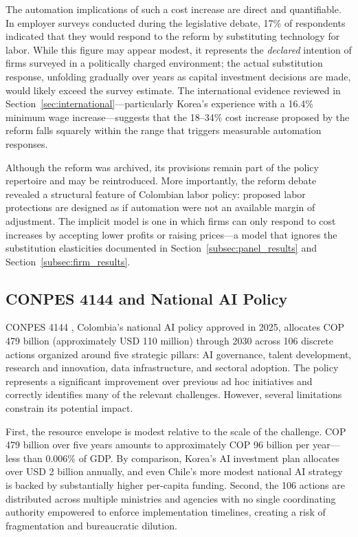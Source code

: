 \documentclass{article}
\begin{document}
The automation implications of such a cost increase are direct and quantifiable. In employer surveys conducted during the legislative debate, 17\% of respondents indicated that they would respond to the reform by substituting technology for labor. While this figure may appear modest, it represents the \textit{declared} intention of firms surveyed in a politically charged environment; the actual substitution response, unfolding gradually over years as capital investment decisions are made, would likely exceed the survey estimate. The international evidence reviewed in Section~\ref{sec:international}---particularly Korea's experience with a 16.4\% minimum wage increase---suggests that the 18--34\% cost increase proposed by the reform falls squarely within the range that triggers measurable automation responses.

Although the reform was archived, its provisions remain part of the policy repertoire and may be reintroduced. More importantly, the reform debate revealed a structural feature of Colombian labor policy: proposed labor protections are designed as if automation were not an available margin of adjustment. The implicit model is one in which firms can only respond to cost increases by accepting lower profits or raising prices---a model that ignores the substitution elasticities documented in Section~\ref{subsec:panel_results} and Section~\ref{subsec:firm_results}.

\subsection{CONPES 4144 and National AI Policy}
\label{subsec:conpes}

CONPES 4144 \cite{conpes4144}, Colombia's national AI policy approved in 2025, allocates COP 479 billion (approximately USD 110 million) through 2030 across 106 discrete actions organized around five strategic pillars: AI governance, talent development, research and innovation, data infrastructure, and sectoral adoption. The policy represents a significant improvement over previous ad hoc initiatives and correctly identifies many of the relevant challenges. However, several limitations constrain its potential impact.

First, the resource envelope is modest relative to the scale of the challenge. COP 479 billion over five years amounts to approximately COP 96 billion per year---less than 0.006\% of GDP. By comparison, Korea's AI investment plan allocates over USD 2 billion annually, and even Chile's more modest national AI strategy is backed by substantially higher per-capita funding. Second, the 106 actions are distributed across multiple ministries and agencies with no single coordinating authority empowered to enforce implementation timelines, creating a risk of fragmentation and bureaucratic dilution.
\end{document}

